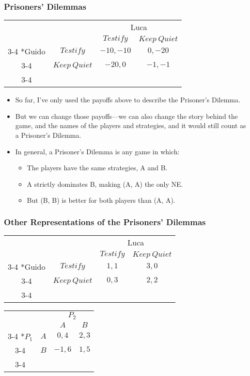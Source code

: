 \begin{frame}
\frametitle{Prisoners' Dilemmas}
\begin{table}[h]
	\centering
	\begin{tabular}{cc|c|c|}
		& \multicolumn{1}{c}{} & \multicolumn{2}{c}{Luca}\\
		& \multicolumn{1}{c}{} & \multicolumn{1}{c}{$Testify$}  & \multicolumn{1}{c}{$Keep~Quiet$} \\\cline{3-4}
		\multirow{2}*{Guido}  & $Testify$ & $-10,-10$ & $0,-20$ \\\cline{3-4}
		& $Keep~Quiet$ & $-20,0$ & $-1,-1$ \\\cline{3-4}
	\end{tabular}
\end{table}
\begin{itemize}
	\item So far, I've only used the payoffs above to describe the Prisoner's Dilemma.
	\item But we can change those payoffs---we can also change the story behind the game, and the names of the players and strategies, and it would still count as a Prisoner's Dilemma.
	\item In general, a Prisoner's Dilemma is any game in which:
	\begin{itemize}
		\item The players have the same strategies, A and B.
		\item A strictly dominates B, making (A, A) the only NE.
		\item But (B, B) is better for both players than (A, A).
	\end{itemize}
\end{itemize}
\end{frame}

\begin{frame}
\frametitle{Other Representations of the Prisoners' Dilemmas}
\begin{table}[h]
	\centering
	\begin{tabular}{cc|c|c|}
		& \multicolumn{1}{c}{} & \multicolumn{2}{c}{Luca}\\
		& \multicolumn{1}{c}{} & \multicolumn{1}{c}{$Testify$}  & \multicolumn{1}{c}{$Keep~Quiet$} \\\cline{3-4}
		\multirow{2}*{Guido}  & $Testify$ & $1, 1$ & $3, 0$ \\\cline{3-4}
		& $Keep~Quiet$ & $0, 3$ & $2, 2$ \\\cline{3-4}
	\end{tabular}
\end{table}
\begin{table}[h]
	\centering
	\begin{tabular}{cc|c|c|}
		& \multicolumn{1}{c}{} & \multicolumn{2}{c}{$P_2$}\\
		& \multicolumn{1}{c}{} & \multicolumn{1}{c}{$A$}  & \multicolumn{1}{c}{$B$} \\\cline{3-4}
		\multirow{2}*{$P_1$}  & $A$ & $0, 4$ & $2, 3$ \\\cline{3-4}
		& $B$ & $-1, 6$ & $1, 5$ \\\cline{3-4}
	\end{tabular}
\end{table}
\end{frame}

